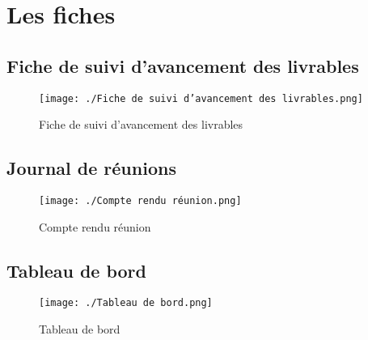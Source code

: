 \section{Les fiches}
\subsection{Fiche de suivi d'avancement des livrables}
\begin{figure}[h]
    \centering
    \texttt{[image: ./Fiche de suivi d'avancement des livrables.png]}
    \caption{Fiche de suivi d'avancement des livrables}
    \label{diagram:si_map}
\end{figure}
\subsection{Journal de réunions}
\begin{figure}[h]
    \centering
    \texttt{[image: ./Compte rendu réunion.png]}
    \caption{Compte rendu réunion}
    \label{diagram:si_map}
\end{figure}
\subsection{Tableau de bord}
\begin{figure}[h]
    \centering
    \texttt{[image: ./Tableau de bord.png]}
    \caption{Tableau de bord}
    \label{diagram:si_map}
\end{figure}
